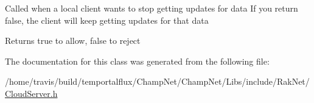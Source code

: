 Called when a local client wants to stop getting updates for data If you return false, the client will keep getting updates for that data \begin{DoxyReturn}{Returns}
true to allow, false to reject 
\end{DoxyReturn}


The documentation for this class was generated from the following file\-:\begin{DoxyCompactItemize}
\item 
/home/travis/build/temportalflux/\-Champ\-Net/\-Champ\-Net/\-Libs/include/\-Rak\-Net/\hyperlink{_cloud_server_8h}{Cloud\-Server.\-h}\end{DoxyCompactItemize}
